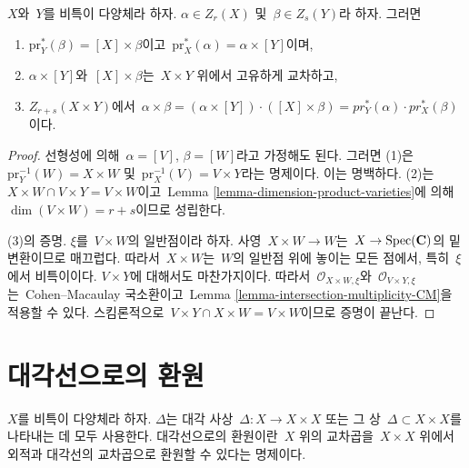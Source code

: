 \begin{lemma}
\label{lemma-exterior-product}
$X$와\  $Y$를 비특이 다양체라 하자.
$\alpha \in Z_r(X)$ 및\  $\beta \in Z_s(Y)$라 하자. 그러면
\begin{enumerate}
\item $\text{pr}_Y^*(\beta) = [X] \times \beta$이고\ 
$\text{pr}_X^*(\alpha) = \alpha \times [Y]$이며,
\item $\alpha \times [Y]$와\  $[X]\times \beta$는\  $X\times Y$ 위에서
고유하게 교차하고,
\item $Z_{r + s}(X \times Y)$에서\ 
$\alpha \times \beta =
(\alpha \times [Y])\cdot ([X]\times\beta) =
pr_Y^*(\alpha) \cdot pr_X^*(\beta)$이다.
\end{enumerate}
\end{lemma}

\begin{proof}
선형성에 의해\  $\alpha = [V]$, $\beta = [W]$라고 가정해도 된다.
그러면 (1)은\  $\text{pr}_Y^{-1}(W) = X \times W$ 및\ 
$\text{pr}_X^{-1}(V) = V \times Y$라는 명제이다. 이는 명백하다.
(2)는\  $X \times W \cap V \times Y = V \times W$이고\ 
Lemma \ref{lemma-dimension-product-varieties}에 의해\ 
$\dim(V \times W) = r + s$이므로 성립한다.

\medskip\noindent
(3)의 증명.
$\xi$를\  $V \times W$의 일반점이라 하자.
사영\  $X \times W \to W$는\  $X \to \mathop{\mathrm{Spec}}(\mathbf{C})$의 밑변환이므로
매끄럽다. 따라서\  $X \times W$는\  $W$의 일반점 위에 놓이는 모든 점에서,
특히\  $\xi$에서 비특이이다. $V \times Y$에 대해서도 마찬가지이다.
따라서\  $\mathcal{O}_{X \times W, \xi}$와\ 
$\mathcal{O}_{V \times Y, \xi}$는\  Cohen--Macaulay 국소환이고\ 
Lemma \ref{lemma-intersection-multiplicity-CM}을 적용할 수 있다.
스킴론적으로\  $V \times Y \cap X \times W = V \times W$이므로 증명이
끝난다.
\end{proof}



\section{대각선으로의 환원}
\label{section-reduction-diagonal}

\noindent
$X$를 비특이 다양체라 하자. $\Delta$는 대각 사상\ 
$\Delta : X \to X \times X$ 또는 그 상\  $\Delta \subset X \times X$를
나타내는 데 모두 사용한다.
대각선으로의 환원이란\  $X$ 위의 교차곱을\  $X \times X$ 위에서 외적과
대각선의 교차곱으로 환원할 수 있다는 명제이다.


